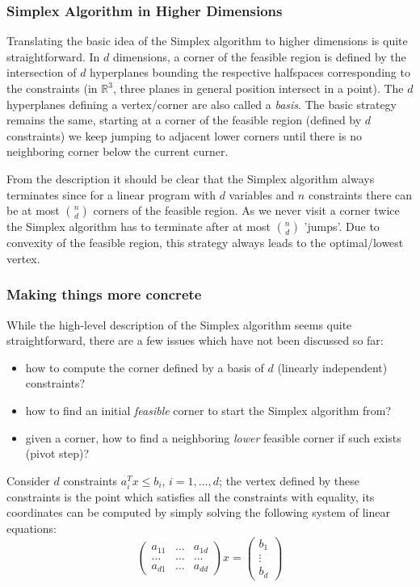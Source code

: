 \documentclass{article}
\newcommand{\mat}[1]{ \begin{pmatrix} #1 \end{pmatrix}}
\begin{document}
\subsubsection{Simplex Algorithm in Higher Dimensions}
Translating the basic idea of the Simplex algorithm to higher dimensions is quite straightforward. In $d$ dimensions, a corner of the feasible region is defined by the intersection of $d$ hyperplanes bounding the respective halfspaces corresponding to the constraints (in $\mathbb{R}^3$, three planes in general position intersect in a point). The $d$ hyperplanes defining a vertex/corner are also called a \emph{basis}. The basic strategy remains the same, starting at a corner of the feasible region (defined by $d$ constraints) we keep jumping to adjacent lower corners until there is no neighboring corner below the current curner.

From the description it should be clear that the Simplex algorithm always terminates since for a linear program with $d$ variables and $n$ constraints there can be at most $n\choose d$ corners of the feasible region. As we never visit a corner twice the Simplex algorithm has to terminate after at most $n \choose d$ 'jumps'. Due to convexity of the feasible region, this strategy always leads to the optimal/lowest vertex.

\subsubsection{Making things more concrete}
While the high-level description of the Simplex algorithm seems quite straightforward, there are a few issues which have not been discussed so far:
\begin{itemize}
\item how to compute the corner defined by a basis of $d$ (linearly independent) constraints?
\item how to find an initial \emph{feasible} corner to start the Simplex algorithm from?
\item given a corner, how to find a neighboring \emph{lower} feasible corner if such exists (pivot step)?
\end{itemize}

Consider $d$ constraints $a_i^T x \leq b_i$, $i=1,\dots, d$; the vertex defined by these constraints is the point which satisfies all the constraints with equality, its coordinates can be computed by simply solving the following system of linear equations:
\[
	\mat{a_{11} & \dots & a_{1d} \\ \dots & \dots & \dots \\ a_{d1} & \dots & a_{dd}} x 
		 = \mat{b_1\\ \vdots \\ b_d}
\]
\end{document}

